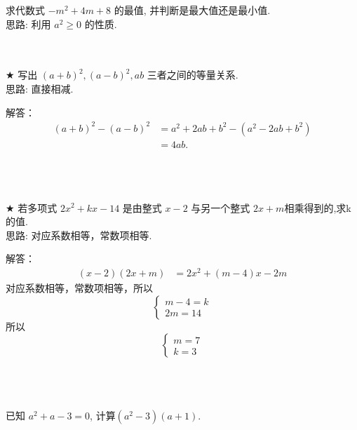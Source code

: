 \item {
    求代数式 $-m^2 + 4m + 8$ 的最值, 并判断是最大值还是最小值.
    \ifshowSolution
        \fangsong{}
        \\
        思路: 利用 $a^2 \geq 0$ 的性质.
    \else
        \\ \\ \\
    \fi
}

\item {
    $\bigstar$
    写出 $(a+b)^2, (a-b)^2, ab$ 三者之间的等量关系.
    \ifshowSolution
        \fangsong{}
        \\
        思路: 直接相减.

        解答：
        \begin{align*}
            (a+b)^2 - (a-b)^2 &= a^2 + 2ab + b^2 - (a^2 - 2ab + b^2) \\
            &= 4ab.
        \end{align*}
    \else
        \\ \\ \\
    \fi
}

\item {
    $\bigstar$
    若多项式 $2x^2 + kx - 14$ 是由整式 $x-2$ 与另一个整式 $2x+m$相乘得到的,求k的值.
    \ifshowSolution
        \fangsong{}
        \\
        思路: 对应系数相等，常数项相等.

        解答：
        \begin{align*}
            (x-2)(2x+m) &= 2x^2 + (m-4)x - 2m
        \end{align*}
        对应系数相等，常数项相等，所以
        \[\left\{ 
            \begin{array}{lc}
                m-4 = k \\
                2m = 14
            \end{array}
        \right.\]
        所以
        \[\left\{ 
            \begin{array}{lc}
                m = 7 \\
                k = 3
            \end{array}
        \right.\]
    \else
        \\ \\ \\
    \fi
}

\item {
    已知 $a^2 + a - 3 = 0$, 计算$(a^2 - 3)(a+1)$.
    \ifshowSolution
        \fangsong{}
        \\
    \else
        \\ \\ \\
    \fi
}

